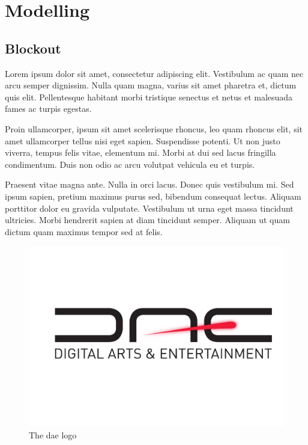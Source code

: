 \documentclass[12pt,a4paper]{report}
\begin{document}
\section{Modelling}

\subsection{Blockout}

Lorem ipsum dolor sit amet, consectetur adipiscing elit. Vestibulum ac quam nec arcu semper dignissim. Nulla quam magna, varius sit amet pharetra et, dictum quis elit. Pellentesque habitant morbi tristique senectus et netus et malesuada fames ac turpis egestas.

Proin ullamcorper, ipsum sit amet scelerisque rhoncus, leo quam rhoncus elit, sit amet ullamcorper tellus nisi eget sapien. Suspendisse potenti. Ut non justo viverra, tempus felis vitae, elementum mi. Morbi at dui sed lacus fringilla condimentum. Duis non odio ac arcu volutpat vehicula eu et turpis.

Praesent vitae magna ante. Nulla in orci lacus. Donec quis vestibulum mi. Sed ipsum sapien, pretium maximus purus sed, bibendum consequat lectus. Aliquam porttitor dolor eu gravida vulputate. Vestibulum ut urna eget massa tincidunt ultricies. Morbi hendrerit sapien at diam tincidunt semper. Aliquam ut quam dictum quam maximus tempor sed at felis.

\begin{figure}[h]
  \centering
    
      \includegraphics[trim=2cm 7cm 0.5cm 6cm,width=1.0\linewidth]{logos/DAE_logo.pdf}
  \caption{The dae logo}
\end{figure}
\end{document}
